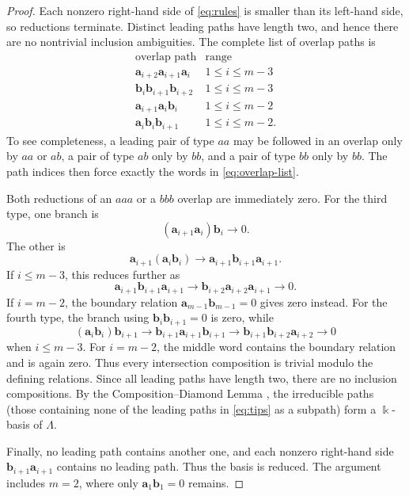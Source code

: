 \documentclass[a4paper,11pt,oneside,reqno]{amsart}
\theoremstyle{definition}
\numberwithin{equation}{section}
\begin{document}
	
	\begin{proof}
		Each nonzero right-hand side of \eqref{eq:rules} is smaller than its
		left-hand side, so reductions terminate.  Distinct leading paths have
		length two, and hence there are no nontrivial inclusion ambiguities.
		The complete list of overlap paths is
		\begin{equation}\label{eq:overlap-list}
			\begin{array}{c|c}
				\text{overlap path}&\text{range}\\\hline
				\mathbf{a}_{i+2}\mathbf{a}_{i+1}\mathbf{a}_i&1\leq i\leq m-3\\
				\mathbf{b}_i\mathbf{b}_{i+1}\mathbf{b}_{i+2}&1\leq i\leq m-3\\
				\mathbf{a}_{i+1}\mathbf{a}_i\mathbf{b}_i&1\leq i\leq m-2\\
				\mathbf{a}_i\mathbf{b}_i\mathbf{b}_{i+1}&1\leq i\leq m-2.
			\end{array}
		\end{equation}
		To see completeness, a leading pair of type $aa$ may be followed in an
		overlap only by $aa$ or $ab$, a pair of type $ab$ only by $bb$, and a pair
		of type $bb$ only by $bb$.  The path indices then force exactly the words
		in \eqref{eq:overlap-list}.
		
		Both reductions of an $aaa$ or a $bbb$ overlap are immediately zero.
		For the third type, one branch is
		\[
		(\mathbf{a}_{i+1}\mathbf{a}_i)\mathbf{b}_i\longrightarrow0.
		\]
		The other is
		\[
		\mathbf{a}_{i+1}(\mathbf{a}_i\mathbf{b}_i)
		\longrightarrow \mathbf{a}_{i+1}\mathbf{b}_{i+1}\mathbf{a}_{i+1}.
		\]
		If $i\leq m-3$, this reduces further as
		\[
		\mathbf{a}_{i+1}\mathbf{b}_{i+1}\mathbf{a}_{i+1}
		\longrightarrow \mathbf{b}_{i+2}\mathbf{a}_{i+2}\mathbf{a}_{i+1}
		\longrightarrow0.
		\]
		If $i=m-2$, the boundary relation $\mathbf{a}_{m-1}\mathbf{b}_{m-1}=0$ gives zero instead.
		For the fourth type, the branch using $\mathbf{b}_i\mathbf{b}_{i+1}=0$ is zero, while
		\[
		(\mathbf{a}_i\mathbf{b}_i)\mathbf{b}_{i+1}
		\longrightarrow \mathbf{b}_{i+1}\mathbf{a}_{i+1}\mathbf{b}_{i+1}
		\longrightarrow \mathbf{b}_{i+1}\mathbf{b}_{i+2}\mathbf{a}_{i+2}
		\longrightarrow0
		\]
		when $i\leq m-3$.  For $i=m-2$, the middle word contains the boundary
		relation and is again zero.  Thus every intersection composition is trivial modulo the defining
		relations.  Since all leading paths have length two, there are no
		inclusion compositions.  By the Composition--Diamond Lemma
		\cite{Bokut,Bergman}, the irreducible paths (those containing none
		of the leading paths in \eqref{eq:tips} as a subpath) form a
		$\Bbbk$-basis of $\Lambda$.
		
		Finally, no leading path contains another one, and each nonzero
		right-hand side $\mathbf{b}_{i+1}\mathbf{a}_{i+1}$ contains no leading path.  Thus the basis
		is reduced.  The argument includes $m=2$, where only $\mathbf{a}_1\mathbf{b}_1=0$ remains.
	\end{proof}
	
\end{document}
